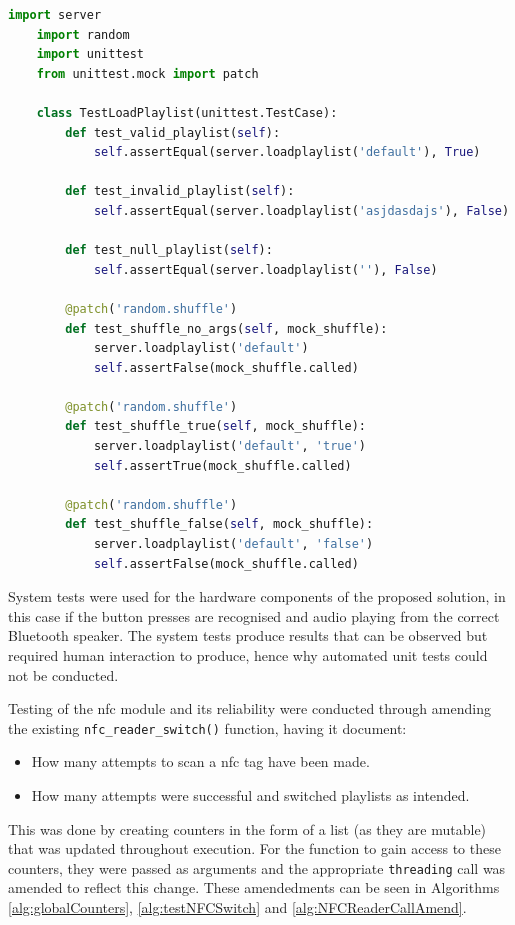 \begin{algorithm}[H]
  \caption{loadPlaylist\_Test - Python}
  \label{alg:playlistTest}
  \begin{lstlisting}[language=Python]
    import server
    import random
    import unittest
    from unittest.mock import patch

    class TestLoadPlaylist(unittest.TestCase):
        def test_valid_playlist(self):
            self.assertEqual(server.loadplaylist('default'), True)
            
        def test_invalid_playlist(self):
            self.assertEqual(server.loadplaylist('asjdasdajs'), False)
            
        def test_null_playlist(self):
            self.assertEqual(server.loadplaylist(''), False)
        
        @patch('random.shuffle')
        def test_shuffle_no_args(self, mock_shuffle):
            server.loadplaylist('default')
            self.assertFalse(mock_shuffle.called)
            
        @patch('random.shuffle')
        def test_shuffle_true(self, mock_shuffle):
            server.loadplaylist('default', 'true')
            self.assertTrue(mock_shuffle.called)
            
        @patch('random.shuffle')
        def test_shuffle_false(self, mock_shuffle):
            server.loadplaylist('default', 'false')
            self.assertFalse(mock_shuffle.called)
  \end{lstlisting}
\end{algorithm}
\clearpage

System tests were used for the hardware components of the proposed solution, in this case if the button presses are recognised and audio playing from the correct Bluetooth speaker. The system tests produce results that can be observed but required human interaction to produce, hence why automated unit tests could not be conducted.

Testing of the \gls{nfc} module and its reliability were conducted through amending the existing \texttt{nfc\_reader\_switch()} function, having it document:
\begin{itemize}
  \item How many attempts to scan a \gls{nfc} tag have been made.
  \item How many attempts were successful and switched playlists as intended.
\end{itemize}

This was done by creating counters in the form of a list (as they are mutable) that was updated throughout execution. For the function to gain access to these counters, they were passed as arguments and the appropriate \texttt{threading} call was amended to reflect this change. These amendedments can be seen in Algorithms \ref{alg:globalCounters}, \ref{alg:testNFCSwitch} and \ref{alg:NFCReaderCallAmend}.

